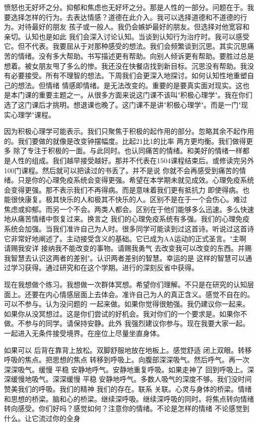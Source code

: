愤怒也无好坏之分。抑郁和焦虑也无好坏之分。那是人性的一部分。问题在于。我要选择怎样的行为。去表达情感？道德在此介入。我可以选择道德和不道德的行为。对待最好的朋友 孩子或一般人。我仍会嫉妒最好的朋友。但选择对他宽容和亲切。认知也是如此 我们会深入讨论认知。当谈到认知行为治疗时。我可以感受它。但不代表。我要屈从于对那种感受的想法。我们会频繁谈到沉思。其实沉思痛苦的情绪。没有多大帮助。书写描述更有帮助。向别人倾诉更有帮助。要胜过总是想着。被女朋友甩了多么的惨。我还没在快餐店找到新目标。沉思没有帮助。我没有必要接受。所有不理智的想法。下周我们会更深入地探讨。如何认知性地重塑自己的想法。但情绪 情感即情绪。是无法改变的。重要的是要真实面对现实。这也是本门课的重要主题之一。从很多方面来说这门课不该叫"积极心理学"。我在你们选了这门课后才挑明。想退课也晚了。这门课不是讲"积极心理学"。而是一门"现实心理学"课程。 

因为积极心理学可能表示。我们只聚焦于积极的起作用的部分。忽略其余不起作用的。我们要做的就像是改变钟摆幅度。比起21比1的比率 两方更均衡。我们做得更多 除了专注于积极的一面。与此同时。也认同痛苦的情绪。和美好的情绪一样都是人性的组成。我们越早接受越好。那并不代表在1504课程结束后。或修读完另外100门课程。然后就可以把读过的书丢了。并不是说 你就不会再感受到痛苦的情绪。只是你的心理免疫系统会变得更强。希望在本学期未就见成效。心理免疫系统会变得更强。那不表示我们不再得病。而是意味着我们更有抵抗力 即使得病。也能很快康复。极其快乐的人和极其不快乐的人。区别不是在于一个会伤心。难过 焦虑或抑郁。而另一个不会。两类人都会。区别在于他们能够多么迅速。多么快速地从痛苦情绪中恢复过来。换言之 我们的心理免疫系统有多强。我们的心理免疫系统会加强。当我们准许自己为人时。很多同学可能读到过这首诗。听说过这首诗 它非常好地阐述了。主动接受含义的基础。它已成为AA运动的正式圣言。"主啊 请赐我安详 接纳我不能改变的事物。请赐我勇气 去改变我可以改变的东西。并赐我智慧去认识这两者的差别"。认识两者差别的智慧。幸运的是 这样的智慧可以通过学习获得。通过研究和在这个学期。进行的深刻反省中获得。 

现在我想做个练习。我想做一次群体冥想。希望你们理解。不只是在研究的认知层面上。还要在内心情感层面上去体会。准许自己为人的真正含义。感觉不自在的。可以不参与。认为没问题的 一起来做。如果你觉得很勉强。我仍建议你一起来。如果你从没冥想过。这是你们尝试的好机会。我对你们的一个要求是。如果你不做。不参与的同学。请保持安静。此外 我强烈建议你参与。现在我要大家一起。一起进入无条件接受境界。在座位上尽量坐直身体。 

如果可以 后背在靠背上放松。双脚舒服地放在地板上。感觉舒适 闭上双眼。转移呼吸的焦点。把思想的焦点 转移到呼吸上。向腹部深深吸气。然后呼气。再一次深深吸气。缓慢 平稳 安静地呼气。安静地重复呼吸。如果走神了 回到呼吸上。深深缓慢地吸气。深深缓慢 平稳 安静地呼气。多数人吸气的深度不够。我们没时间赞美我们的呼吸。我们的精神 我们的存在。联系 关联。心灵与身体的桥梁。情绪和思想的桥梁。脑和心的桥梁。继续深呼吸。继续深呼吸的同时。将焦点转向情绪 转向感受。你们好吗？感觉如何？注意你的情绪。不论是怎样的情绪 不论感觉到什么。让它流过你的全身 

